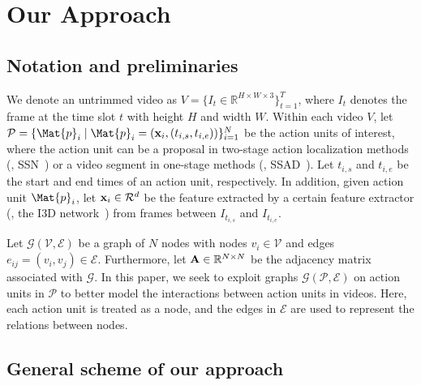 \documentclass[10pt,journal,compsoc]{IEEEtran}
\begin{document}
	\section{Our Approach}\label{Sec:graph}
	
	\subsection{Notation and preliminaries} \label{Sec:notation}
	We denote an untrimmed video as $V=\{I_t\in\mathbb{R}^{H\times W\times 3}\}_{t=1}^T$, where $I_t$ denotes the frame at the time slot $t$ with height $H$ and width $W$.
	Within each video $V$,  let $\mP=\{\Mat{p}_i\mid\Mat{p}_i=(\bx_i, (t_{i,s}, t_{i,e}))\}_{i=1}^N$ be the action units of interest, where the action unit can be a proposal in two-stage action localization methods (\eg, SSN~\cite{zhao2017temporal}) or a video segment in one-stage methods (\eg, SSAD~\cite{lin2017single}).
	Let $t_{i,s}$ and $t_{i,e}$ be the start and end times of an action unit, respectively. In addition, given action unit $\Mat{p}_i$, let ${\bf x}_i\in\mathcal{R}^d$ be the feature extracted by a certain feature extractor (\eg, the I3D network~\cite{carreira2017quo}) from frames between $I_{t_{i,s}}$ and $I_{t_{i,e}}$.
	
	Let $\mathcal{G}(\mathcal{V}, \mathcal{E})$ be a graph of $N$ nodes with nodes $v_i\in\mathcal{V}$ and edges $e_{ij}=(v_i, v_j)\in\mathcal{E}$. Furthermore, let ${\bf A}\in\mathbb{R}^{N\times N}$ be the adjacency matrix  associated with $\mathcal{G}$.
	In this paper, we seek to exploit graphs $\mathcal{G}(\mathcal{P},\mathcal{E})$ on action units in $\mathcal{P}$ to better model the interactions between action units in videos. Here, each action unit is treated as a node, and the edges in $\mathcal{E}$ are used to represent the relations between nodes.
	
	\subsection{General scheme of our approach}
	
\end{document}
